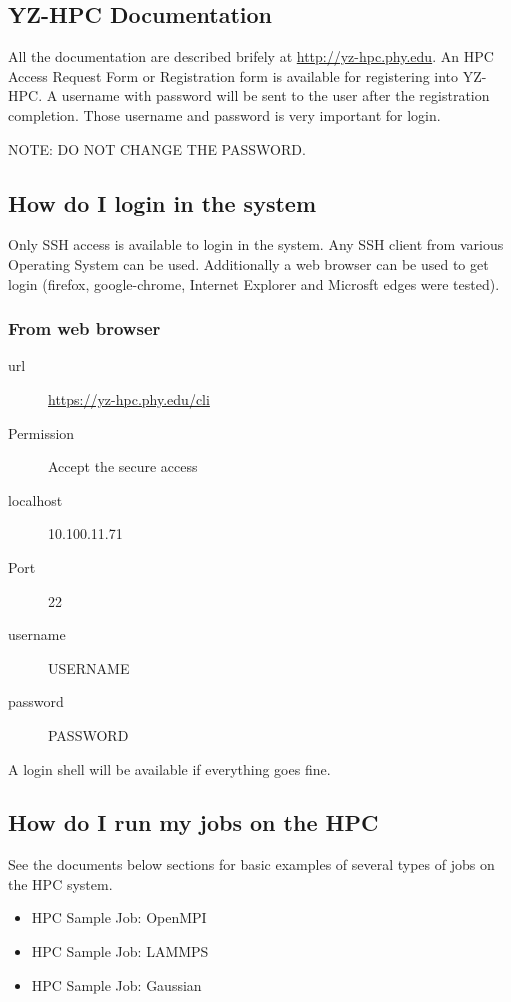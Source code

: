 \documentclass[11pt]{article}
\numberwithin{figure}{section}
\begin{document}
\subsection{YZ-HPC Documentation}
All the documentation are described brifely at \href{http://10.100.11.71} {http://yz-hpc.phy.edu}. An HPC Access Request Form or Registration form is available for registering into YZ-HPC. A username with password will be sent to the user after the registration completion. Those username and password is very important for login.

NOTE: DO NOT CHANGE THE PASSWORD.

\subsection{How do I login in the system}
Only SSH access is available to login in the system. Any SSH client from
various Operating System can be used. Additionally a web browser can be used to
get login (firefox, google-chrome, Internet Explorer and Microsft edges were
tested).

\subsubsection{From web browser}

\begin{description}
    \item[url] \href{https://10.100.11.71/cli}{https://yz-hpc.phy.edu/cli}
    \item[Permission] Accept the secure access
    \item[localhost] 10.100.11.71
    \item[Port] 22
    \item[username] USERNAME
    \item[password] PASSWORD
\end{description}

A login shell will be available if everything goes fine.

\subsection{How do I run my jobs on the HPC}
See the documents below sections for basic examples of several types of jobs on
the HPC system.

\begin{itemize}
    \item HPC Sample Job: OpenMPI
    \item HPC Sample Job: LAMMPS
    \item HPC Sample Job: Gaussian
\end{itemize}
\end{document}
